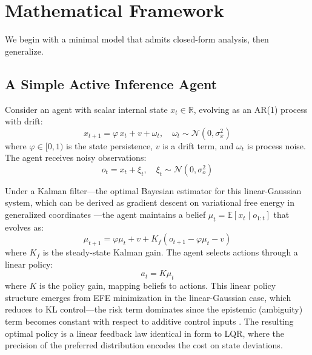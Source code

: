 \documentclass[runningheads]{llncs}
\begin{document}
\section{Mathematical Framework}
\label{sec:math}

We begin with a minimal model that admits closed-form analysis, then generalize.

\subsection{A Simple Active Inference Agent}

Consider an agent with scalar internal state $x_t \in \mathbb{R}$, evolving as an AR(1) process with drift:
\begin{equation}
    x_{t+1} = \varphi \, x_t + v + \omega_t, \quad \omega_t \sim \mathcal{N}(0, \sigma_x^2)
    \label{eq:state_dynamics}
\end{equation}
where $\varphi \in [0,1)$ is the state persistence, $v$ is a drift term, and $\omega_t$ is process noise. The agent receives noisy observations:
\begin{equation}
    o_t = x_t + \xi_t, \quad \xi_t \sim \mathcal{N}(0, \sigma_o^2)
    \label{eq:observations}
\end{equation}

Under a Kalman filter---the optimal Bayesian estimator for this linear-Gaussian system, which can be derived as gradient descent on variational free energy in generalized coordinates \cite{friston2008variational,baltieri2020kalman}---the agent maintains a belief $\mu_t = \mathbb{E}[x_t \mid o_{1:t}]$ that evolves as:
\begin{equation}
    \mu_{t+1} = \varphi \mu_t + v + K_f(o_{t+1} - \varphi \mu_t - v)
    \label{eq:belief_update}
\end{equation}
where $K_f$ is the steady-state Kalman gain. The agent selects actions through a linear policy:
\begin{equation}
    a_t = K \mu_t
    \label{eq:policy}
\end{equation}
where $K$ is the policy gain, mapping beliefs to actions. This linear policy structure emerges from EFE minimization in the linear-Gaussian case, which reduces to KL control---the risk term dominates since the epistemic (ambiguity) term becomes constant with respect to additive control inputs \cite{koudahl2021efe,baltieri2020kalman}. The resulting optimal policy is a linear feedback law identical in form to LQR, where the precision of the preferred distribution encodes the cost on state deviations.
\end{document}
